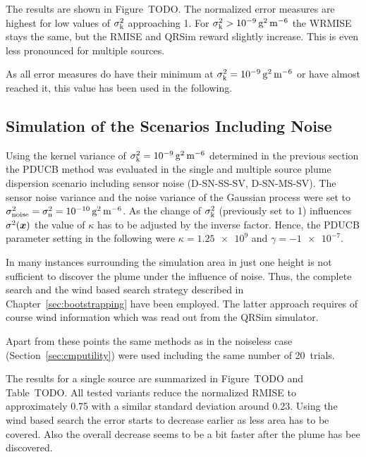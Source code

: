 The results are shown in Figure~TODO\@. The normalized error measures are 
highest for low values of $\sigma_{\mathrm{k}}^2$ approaching 1. For $\sigma\ped{k}^2 
> \SI{1e-9}{\gram\squared\per\meter\tothe{6}}$ the WRMISE stays the same, but 
the RMISE and QRSim reward slightly increase. This is even less pronounced for 
multiple sources.

As all error measures do have their minimum at $\sigma\ped{k}^2 
= \SI{1e-9}{\gram\squared\per\meter\tothe{6}}$ or have almost reached it, this 
value has been used in the following.

\subsection{Simulation of the Scenarios Including Noise}
Using the kernel variance of $\sigma\ped{k}^2 
= \SI{1e-9}{\gram\squared\per\meter\tothe{6}}$ determined in the previous 
section the PDUCB method was evaluated in the single and multiple source plume 
dispersion scenario including sensor noise (D-SN-SS-SV, D-SN-MS-SV). The sensor 
noise variance and the noise variance of the Gaussian process were set to 
$\sigma\ped{noise}^2 = \sigma\ped{n}^2 
= \SI{1e-10}{\gram\squared\per\meter\tothe{6}}$.  As the change of 
$\sigma_{\mathrm{k}}^2$ (previously set to 1) influences $\sigma^2(\bm{x})$ the value 
of $\kappa$ has to be adjusted by the inverse factor. Hence, the PDUCB parameter 
setting in the following were $\kappa = \num{1.25e9}$ and $\gamma 
= \num{-1e-7}$.

In many instances surrounding the simulation area in just one height is not 
sufficient to discover the plume under the influence of noise. Thus, the 
complete search and the wind based search strategy described in 
Chapter~\ref{sec:bootstrapping} have been employed. The latter approach requires 
of course wind information which was read out from the QRSim simulator.

Apart from these points the same methods as in the noiseless case 
(Section~\ref{sec:cmputility}) were used including the same number of 20~trials.

The results for a single source are summarized in Figure~TODO and Table~TODO\@.  
All tested variants reduce the normalized RMISE to approximately \num{0.75} with 
a similar standard deviation around \num{0.23}. Using the wind based search the 
error starts to decrease earlier as less area has to be covered. Also the 
overall decrease seems to be a bit faster after the plume has bee discovered.

